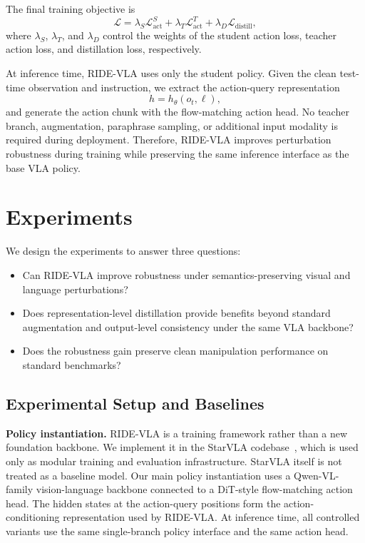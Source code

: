 \documentclass[letterpaper]{article} %
\newcommand{\method}{\textsc{RIDE-VLA}}
\begin{document}
The final training objective is
\begin{equation}
    \mathcal{L}
    =
    \lambda_S \mathcal{L}_{\mathrm{act}}^{S}
    +
    \lambda_T \mathcal{L}_{\mathrm{act}}^{T}
    +
    \lambda_D \mathcal{L}_{\mathrm{distill}},
\end{equation}
where $\lambda_S$, $\lambda_T$, and $\lambda_D$ control the weights of the student action loss, teacher action loss, and distillation loss, respectively.

At inference time, \method{} uses only the student policy. Given the clean test-time observation and instruction, we extract the action-query representation
\begin{equation}
    h = h_\theta(o_t,\ell),
\end{equation}
and generate the action chunk with the flow-matching action head. No teacher branch, augmentation, paraphrase sampling, or additional input modality is required during deployment. Therefore, \method{} improves perturbation robustness during training while preserving the same inference interface as the base VLA policy.


\section{Experiments}

We design the experiments to answer three questions:
\begin{itemize}
    \item Can \method{} improve robustness under semantics-preserving visual and language perturbations?
    \item Does representation-level distillation provide benefits beyond standard augmentation and output-level consistency under the same VLA backbone?
    \item Does the robustness gain preserve clean manipulation performance on standard benchmarks?
\end{itemize}

\subsection{Experimental Setup and Baselines}

\textbf{Policy instantiation.} \method{} is a training framework rather than a new foundation backbone. We implement it in the StarVLA codebase~\cite{starvla2026}, which is used only as modular training and evaluation infrastructure. StarVLA itself is not treated as a baseline model. Our main policy instantiation uses a Qwen-VL-family vision-language backbone connected to a DiT-style flow-matching action head. The hidden states at the action-query positions form the action-conditioning representation used by \method{}. At inference time, all controlled variants use the same single-branch policy interface and the same action head.
\end{document}
